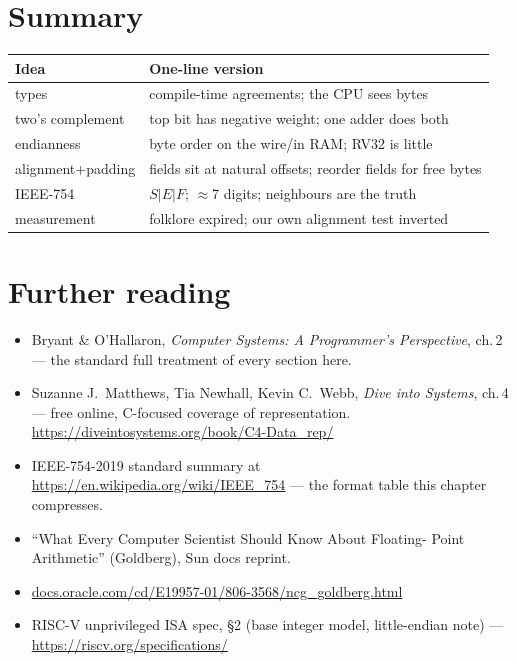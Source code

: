\section*{Summary}
\label{sec:summary02}

\begin{center}
\begin{tabularx}{\linewidth}{lX}
\toprule
\textbf{Idea} & \textbf{One-line version} \\
\midrule
types & compile-time agreements; the CPU sees bytes \\
two's complement & top bit has negative weight; one adder does both \\
endianness & byte order on the wire/in RAM; RV32 is little \\
alignment+padding & fields sit at natural offsets; reorder fields
for free bytes \\
IEEE-754 & $S|E|F$; $\approx$7 digits; neighbours are the truth \\
measurement & folklore expired; our own alignment test inverted \\
\bottomrule
\end{tabularx}
\end{center}

\section*{Further reading}
\label{sec:fr02}

\begin{itemize}
  \item Bryant \& O'Hallaron, \emph{Computer Systems: A Programmer's
        Perspective}, ch.\,2 --- the standard full treatment of every
        section here.
  \item Suzanne J.\ Matthews, Tia Newhall, Kevin C.\ Webb,
        \emph{Dive into Systems}, ch.\,4 --- free online, C-focused
        coverage of representation.
        \url{https://diveintosystems.org/book/C4-Data_rep/}
  \item IEEE-754-2019 standard summary at
        \url{https://en.wikipedia.org/wiki/IEEE_754} --- the format
        table this chapter compresses.
  \item ``What Every Computer Scientist Should Know About Floating-
        Point Arithmetic'' (Goldberg), Sun docs reprint.
  \item[] \href{https://docs.oracle.com/cd/E19957-01/806-3568/ncg_goldberg.html}{docs.oracle.com/cd/E19957-01/806-3568/ncg\_goldberg.html}
  \item RISC-V unprivileged ISA spec, \S2 (base integer model,
        little-endian note) ---
        \url{https://riscv.org/specifications/}
\end{itemize}


